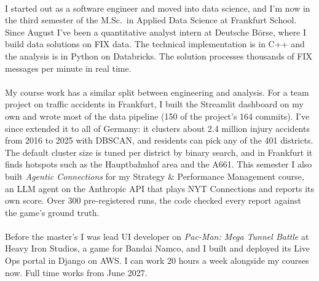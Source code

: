 \paragraph{}
I started out as a software engineer and moved into data science, and I'm now in the third semester of the M.Sc.\ in Applied Data Science at Frankfurt School.
Since August I've been a quantitative analyst intern at Deutsche B\"orse, where I build data solutions on FIX data.
The technical implementation is in C++ and the analysis is in Python on Databricks.
The solution processes thousands of FIX messages per minute in real time.

\paragraph{}
My course work has a similar split between engineering and analysis.
For a team project on traffic accidents in Frankfurt, I built the Streamlit dashboard on my own and wrote most of the data pipeline (150 of the project's 164 commits).
I've since extended it to all of Germany: it clusters about 2.4 million injury accidents from 2016 to 2025 with DBSCAN, and residents can pick any of the 401 districts.
The default cluster size is tuned per district by binary search, and in Frankfurt it finds hotspots such as the Hauptbahnhof area and the A661.
This semester I also built \textit{Agentic Connections} for my Strategy \& Performance Management course, an LLM agent on the Anthropic API that plays NYT Connections and reports its own score.
Over 300 pre-registered runs, the code checked every report against the game's ground truth.

\paragraph{}
Before the master's I was lead UI developer on \textit{Pac-Man: Mega Tunnel Battle} at Heavy Iron Studios, a game for Bandai Namco, and I built and deployed its Live Ops portal in Django on AWS\@.
I can work 20 hours a week alongside my courses now.
Full time works from June 2027.

